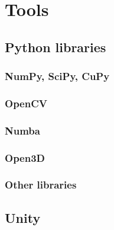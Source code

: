 \chapter{Tools}
\label{chap:tools}

\section{Python libraries}
\subsection{NumPy, SciPy, CuPy}
\subsection{OpenCV}
\subsection{Numba}
\subsection{Open3D}
\subsection{Other libraries}

\section{Unity}

